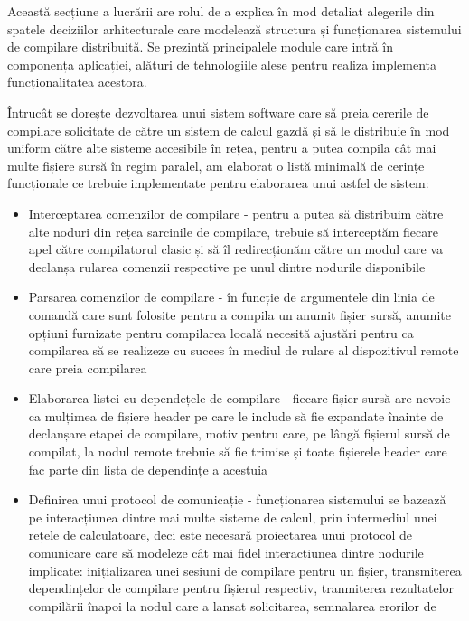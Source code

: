 Această secțiune a lucrării are rolul de a explica în mod detaliat alegerile din spatele deciziilor arhitecturale
care modelează structura și funcționarea sistemului de compilare distribuită. Se prezintă principalele module
care intră în componența aplicației, alături de tehnologiile alese pentru realiza implementa funcționalitatea acestora.

Întrucât se dorește dezvoltarea unui sistem software care să preia cererile de compilare solicitate de către un sistem
de calcul gazdă și să le distribuie în mod uniform către alte sisteme accesibile în rețea, pentru a putea compila cât mai multe
fișiere sursă în regim paralel, am elaborat o listă minimală de cerințe funcționale ce trebuie implementate pentru elaborarea
unui astfel de sistem:

\begin{itemize}
    \item Interceptarea comenzilor de compilare - pentru a putea să distribuim către alte noduri din rețea sarcinile de compilare,
    trebuie să interceptăm fiecare apel către compilatorul clasic și să îl redirecționăm către un modul care va declanșa rularea comenzii
    respective pe unul dintre nodurile disponibile 
    \item Parsarea comenzilor de compilare - în funcție de argumentele din linia de comandă care sunt folosite pentru a compila
    un anumit fișier sursă, anumite opțiuni furnizate pentru compilarea locală necesită ajustări pentru ca compilarea să se realizeze
    cu succes în mediul de rulare al dispozitivul remote care preia compilarea
    \item Elaborarea listei cu dependețele de compilare - fiecare fișier sursă are nevoie ca mulțimea de fișiere header pe care le include
    să fie expandate înainte de declanșare etapei de compilare, motiv pentru care, pe lângă fișierul sursă de compilat, la nodul remote
    trebuie să fie trimise și toate fișierele header care fac parte din lista de dependințe a acestuia
    \item Definirea unui protocol de comunicație - funcționarea sistemului se bazează pe interacțiunea dintre mai 
    multe sisteme de calcul, prin intermediul unei rețele de calculatoare, deci este necesară proiectarea unui protocol de comunicare care să modeleze cât mai fidel
    interacțiunea dintre nodurile implicate: inițializarea unei sesiuni de compilare pentru un fișier, transmiterea dependințelor de compilare
    pentru fișierul respectiv, tranmiterea rezultatelor compilării înapoi la nodul care a lansat solicitarea, semnalarea erorilor de

\end{itemize}
